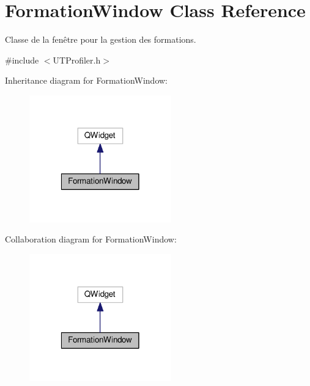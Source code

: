 \hypertarget{class_formation_window}{\section{Formation\-Window Class Reference}
\label{class_formation_window}
}


Classe de la fenêtre pour la gestion des formations.  




{\ttfamily \#include $<$U\-T\-Profiler.\-h$>$}



Inheritance diagram for Formation\-Window\-:
\nopagebreak
\begin{figure}[H]
\begin{center}
\leavevmode
\includegraphics[width=174pt]{class_formation_window__inherit__graph}
\end{center}
\end{figure}


Collaboration diagram for Formation\-Window\-:
\nopagebreak
\begin{figure}[H]
\begin{center}
\leavevmode
\includegraphics[width=174pt]{class_formation_window__coll__graph}
\end{center}
\end{figure}
